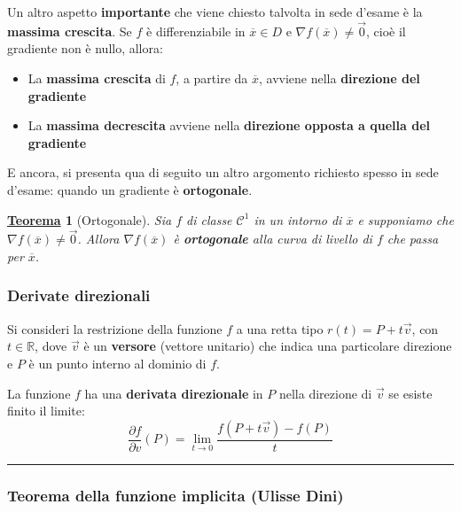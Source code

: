 \documentclass[a4paper]{article}
\newtheorem{theorem}{\textcolor{Red3}{\underline{Teorema}}}
\newcommand{\longline}{\noindent\rule{\textwidth}{0.4pt}}
\newcommand{\definition}[1]{\textcolor{Red3}{\textbf{#1}}}
\begin{document}
	\noindent
	Un altro aspetto \textbf{importante} che viene chiesto talvolta in sede d'esame è la \definition{massima crescita}. Se $f$ è differenziabile in $\overline{x} \in D$ e $\nabla f\left(\overline{x}\right) \ne \overrightarrow{0}$, cioè il gradiente non è nullo, allora:
	\begin{itemize}
		\item La \textbf{massima crescita} di $f$, a partire da $\overline{x}$, avviene nella \textbf{direzione del gradiente}

		\item La \textbf{massima decrescita} avviene nella \textbf{direzione opposta a quella del gradiente}
	\end{itemize}
	E ancora, si presenta qua di seguito un altro argomento richiesto spesso in sede d'esame: quando un gradiente è \definition{ortogonale}.
	\begin{theorem}[Ortogonale]\label{theorem: ortogonale}
		Sia $f$ di classe $\mathcal{C}^{1}$ in un intorno di $\overline{x}$ e supponiamo che $\nabla f\left(\overline{x}\right) \ne \overrightarrow{0}$. Allora $\nabla f\left(\overline{x}\right)$ è \definition{ortogonale} alla curva di livello di $f$ che passa per $\overline{x}$.
	\end{theorem}
	

	\newpage

	\subsubsection{Derivate direzionali}\label{subsubsection: derivate direzionali}

	Si consideri la restrizione della funzione $f$ a una retta tipo $r\left(t\right) = P + t\overrightarrow{v}$, con $t \in \mathbb{R}$, dove $\overrightarrow{v}$ è un \textbf{versore} (vettore unitario) che indica una particolare direzione e $P$ è un punto interno al dominio di $f$.
	\begin{boxdef}
		La funzione $f$ ha una \definition{derivata direzionale} in $P$ nella direzione di $\overrightarrow{v}$ se esiste finito il limite:
		\begin{equation}
			\dfrac{\partial f}{\partial v}\left(P\right) = \displaystyle\lim_{t \rightarrow 0} \dfrac{f\left(P + t\overrightarrow{v}\right) - f\left(P\right)}{t}
		\end{equation}
	\end{boxdef}
	
	\longline

	\subsubsection{Teorema della funzione implicita (Ulisse Dini)}\label{subsubsection: teorema della funzione implicita (Ulisse Dini)}
\end{document}
